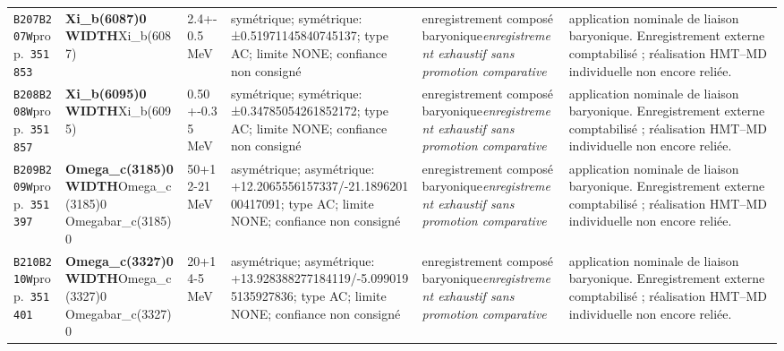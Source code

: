 \begin{landscape}
\begin{longtable}{L{1.85cm}L{4.45cm}L{2.35cm}L{4.05cm}L{3.35cm}L{7.15cm}}
\texttt{B207}\newline \texttt{B207W}\newline prop.\ \texttt{351853} & \textbf{Xi\_\allowbreak{}b(6087)0 WIDTH}\newline Xi\_\allowbreak{}b(6087) & 2.4+-0.5\,MeV & symétrique; symétrique: ±0.51971145840745137; type AC; limite NONE; confiance non consigné & enregistrement composé baryonique\newline \emph{enregistrement exhaustif sans promotion comparative} & application nominale de liaison baryonique. Enregistrement externe comptabilisé ; réalisation HMT--MD individuelle non encore reliée. \\
\texttt{B208}\newline \texttt{B208W}\newline prop.\ \texttt{351857} & \textbf{Xi\_\allowbreak{}b(6095)0 WIDTH}\newline Xi\_\allowbreak{}b(6095) & 0.50+-0.35\,MeV & symétrique; symétrique: ±0.34785054261852172; type AC; limite NONE; confiance non consigné & enregistrement composé baryonique\newline \emph{enregistrement exhaustif sans promotion comparative} & application nominale de liaison baryonique. Enregistrement externe comptabilisé ; réalisation HMT--MD individuelle non encore reliée. \\
\texttt{B209}\newline \texttt{B209W}\newline prop.\ \texttt{351397} & \textbf{Omega\_\allowbreak{}c(3185)0 WIDTH}\newline Omega\_\allowbreak{}c(3185)0 \textbar{}\allowbreak{} Omegabar\_\allowbreak{}c(3185)0 & 50+12-21\,MeV & asymétrique; asymétrique: +12.2065556157337/-21.189620100417091; type AC; limite NONE; confiance non consigné & enregistrement composé baryonique\newline \emph{enregistrement exhaustif sans promotion comparative} & application nominale de liaison baryonique. Enregistrement externe comptabilisé ; réalisation HMT--MD individuelle non encore reliée. \\
\texttt{B210}\newline \texttt{B210W}\newline prop.\ \texttt{351401} & \textbf{Omega\_\allowbreak{}c(3327)0 WIDTH}\newline Omega\_\allowbreak{}c(3327)0 \textbar{}\allowbreak{} Omegabar\_\allowbreak{}c(3327)0 & 20+14-5\,MeV & asymétrique; asymétrique: +13.928388277184119/-5.0990195135927836; type AC; limite NONE; confiance non consigné & enregistrement composé baryonique\newline \emph{enregistrement exhaustif sans promotion comparative} & application nominale de liaison baryonique. Enregistrement externe comptabilisé ; réalisation HMT--MD individuelle non encore reliée. \\

\end{longtable}
\end{landscape}
